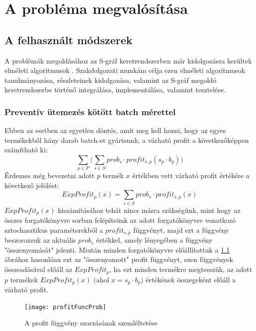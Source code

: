 \chapter{A probléma megvalósítása}  \label{Problem_impl}
\section{A felhasznált módszerek} \label{math_modells}
A problémák megoldásához az S-gráf keretrendszerben már kidolgozásra kerültek elméleti algoritmusok \cite{phd_Hegyhati}.
Szakdolgozati munkám célja ezen elméleti algoritmusok tanulmányozása, részleteinek kidolgozása, valamint az S-gráf megoldó keretrendszerbe történő integrálása, implementálása, valamint tesztelése.
\subsection{Preventív ütemezés kötött batch mérettel} \label{FixBatchSize}
Ebben az esetben az egyetlen döntés, amit meg kell hozni, hogy az egyes termékekből hány darab batch-et gyártsunk, a várható profit a következőképpen számítható ki:
$$\sum_{p \in P}\bigg (\sum_{s \in S} prob_s \cdot profit_{s,p} (s_p \cdot b_p)\bigg)$$
Érdemes még bevezetni adott $p$ termék $x$ értékben vett várható profit értékére a következő jelölést:
$$ExpProfit_p(x)=\sum_{s \in S}prob_s \cdot profit_{s,p}(x)$$
$ExpProfit_p(x)$ kiszámításához tehát nincs másra szükségünk, mint hogy az összes forgatókönyvre sorban felépítsünk az adott forgatókönyvre vonatkozó sztochasztikus paraméterekből a $profit_{s,p}$ függvényt, majd ezt a függvény beszorozzuk az aktuális $prob_s$ értékkel, amely lényegében a függvény "összenyomását" jelenti. 
Miután minden forgatókönyvre előállítottuk a \ref{profit_func_prob} ábrához hasonlóan ezt az "összenyomott" profit függvényt, ezen függvények összeadásával előáll az $ExpProfit_p$, ha ezt minden termékre megtesszük, az adott $p$ termékek $ExpProfit_p(x) \text{ (ahol }x=s_p \cdot b_p)$ értékének összegeként előáll a várható profit.
\begin{figure}[H]
\begin{center}
\texttt{[image: profitFuncProb]}
\caption{A profit függvény szorzásának szemléltetése}
\label{profit_func_prob}
\end{center}
\end{figure}

